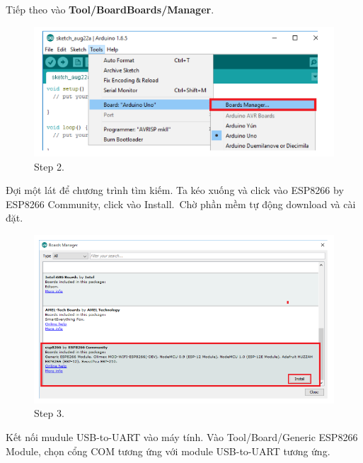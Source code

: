 \documentclass[a4paper,12pt,oneside]{article}
\begin{document}
\begin{itemize}
Tiếp theo vào \textbf{Tool/BoardBoards/Manager}.
\begin{figure}[H]
\begin{center}
\includegraphics[scale=1]{hinh/caidatesp2.png}
\end{center}
\caption{Step 2.}
\end{figure}
Đợi một lát để chương trình tìm kiếm. Ta kéo xuống và click vào ESP8266 by ESP8266 Community, click vào Install.\
Chờ phần mềm tự động download và cài đặt.
\begin{figure}[H]
\begin{center}
\includegraphics[scale=0.7]{hinh/caidatesp3.png}
\end{center}
\caption{Step 3.}
\end{figure}
Kết nối mudule USB-to-UART vào máy tính. Vào Tool/Board/Generic ESP8266 Module, chọn cổng COM tương ứng với module USB-to-UART tương ứng.
\begin{figure}[H]
\begin{center}

\end{center}
\end{figure}
\end{itemize}
\end{document}
